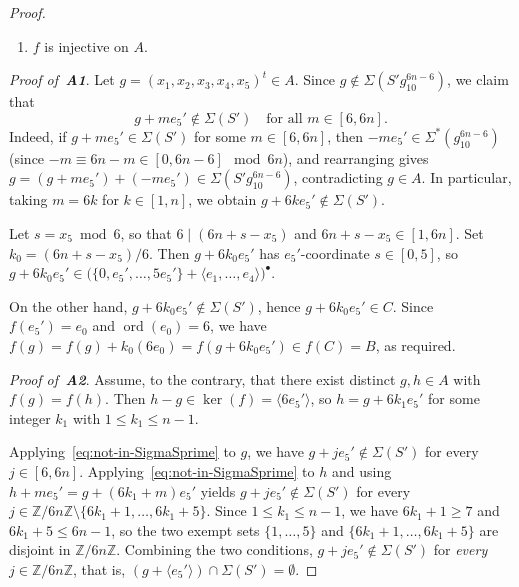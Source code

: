 \documentclass[10pt,a4paper]{amsart}
\DeclareMathOperator{\ord}{ord}
\begin{document}
\begin{proof}
\begin{enumerate}
\item[{\bf A2.}\,] $f$ is injective on $A$.
\end{enumerate}

\smallskip

{\it Proof of \,{\bf A1}}. Let $g = (x_1, x_2, x_3, x_4, x_5)^t \in A$. Since
	$g \notin \Sigma(S' g_{10}^{6n-6})$, we claim that
	\begin{equation}\label{eq:not-in-SigmaSprime}
	g + m e_5' \notin \Sigma(S')
	\quad \text{for all } m \in [6, 6n].
	\end{equation}
	Indeed, if $g + m e_5' \in \Sigma(S')$ for some $m \in [6, 6n]$, then
	$-m e_5' \in \Sigma^*(g_{10}^{6n-6})$ (since
	$-m \equiv 6n - m \in [0, 6n-6] \mod{6n}$), and rearranging gives
	$g = (g + m e_5') + (-m e_5') \in \Sigma(S' g_{10}^{6n-6})$,
	contradicting $g \in A$. In particular, taking $m = 6k$ for
	$k \in [1,n]$, we obtain $g + 6k e_5' \notin \Sigma(S')$.
	
	Let $s = x_5 \bmod 6$, so that $6 \mid (6n + s - x_5)$ and
	$6n + s - x_5 \in [1, 6n]$. Set $k_0 = (6n + s - x_5)/6$. Then
	$g + 6k_0 e_5'$ has $e_5'$-coordinate $s \in [0, 5]$, so
	$g + 6k_0 e_5' \in
	\bigl(\{0, e_5', \dots, 5e_5'\} + \langle e_1, \dots, e_4\rangle
	\bigr)^{\bullet}.$
	
	On the other hand, $g + 6k_0 e_5' \notin \Sigma(S')$,
	hence $g + 6k_0 e_5' \in C$. Since $f(e_5') = e_0$ and
	$\ord(e_0) = 6$, we have
	$f(g) = f(g) + k_0 (6 e_0) = f(g + 6k_0 e_5') \in f(C) = B$,
	as required.
	
{\it Proof of \,{\bf A2}}.	 Assume, to the contrary, that there exist distinct $g, h \in A$ with
	$f(g) = f(h)$. Then $h - g \in \ker(f) = \langle 6 e_5' \rangle$, so
	$h = g + 6k_1 e_5'$ for some integer $k_1$ with $1 \leq k_1 \leq n-1$.
	
	Applying~\eqref{eq:not-in-SigmaSprime} to $g$, we have
	$g + j e_5' \notin \Sigma(S')$ for every
	$j \in [6,6n]$.
	Applying~\eqref{eq:not-in-SigmaSprime} to $h$ and using
	$h + m e_5' = g + (6k_1 + m) e_5'$ yields
	$g + j e_5' \notin \Sigma(S')$ for every
	$j \in \mathbb{Z}/6n\mathbb{Z} \setminus \{6k_1 + 1, \dots, 6k_1 + 5\}$.
	Since $1 \leq k_1 \leq n-1$, we have $6k_1 + 1 \geq 7$ and
	$6k_1 + 5 \leq 6n - 1$, so the two exempt sets $\{1, \dots, 5\}$ and
	$\{6k_1 + 1, \dots, 6k_1 + 5\}$ are disjoint in $\mathbb{Z}/6n\mathbb{Z}$.
	Combining the two conditions, $g + j e_5' \notin \Sigma(S')$ for
	\emph{every} $j \in \mathbb{Z}/6n\mathbb{Z}$, that is, $(g + \langle e_5' \rangle) \cap \Sigma(S') = \emptyset.$
	

\end{proof}
\end{document}
